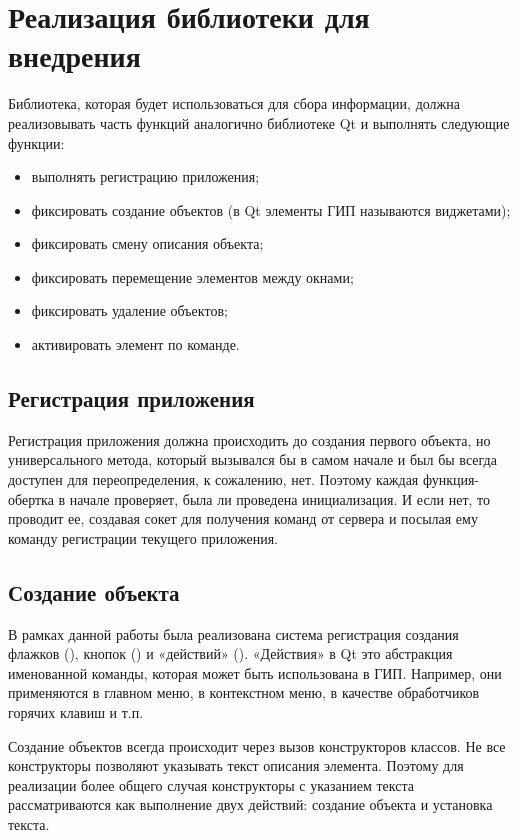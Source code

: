 \section{Реализация библиотеки для внедрения}

Библиотека, которая будет использоваться для сбора информации, должна
реализовывать часть функций аналогично библиотеке Qt и выполнять следующие
функции:

\begin{itemize}
    \item выполнять регистрацию приложения;
    \item фиксировать создание объектов (в Qt элементы ГИП называются
        виджетами);
    \item фиксировать смену описания объекта;
    \item фиксировать перемещение элементов между окнами;
    \item фиксировать удаление объектов;
    \item активировать элемент по команде.
\end{itemize}

\subsection{Регистрация приложения}

Регистрация приложения должна происходить до создания первого объекта, но
универсального метода, который вызывался бы в самом начале и был бы всегда
доступен для переопределения, к сожалению, нет. Поэтому каждая функция-обертка
в начале проверяет, была ли проведена инициализация. И если нет, то
проводит ее, создавая сокет для получения команд от сервера и посылая ему
команду регистрации текущего приложения.

\subsection{Создание объекта}

В рамках данной работы была реализована система регистрация создания флажков
(), кнопок () и «действий» ().
«Действия» в Qt это абстракция именованной команды, которая может быть
использована в ГИП\cite{qaction}. Например, они применяются в главном меню, в
контекстном меню, в качестве обработчиков горячих клавиш и т.п.

Создание объектов всегда происходит через вызов конструкторов классов. Не все
конструкторы позволяют указывать текст описания элемента. Поэтому для реализации
более общего случая конструкторы с указанием текста рассматриваются как
выполнение двух действий: создание объекта и установка текста.

